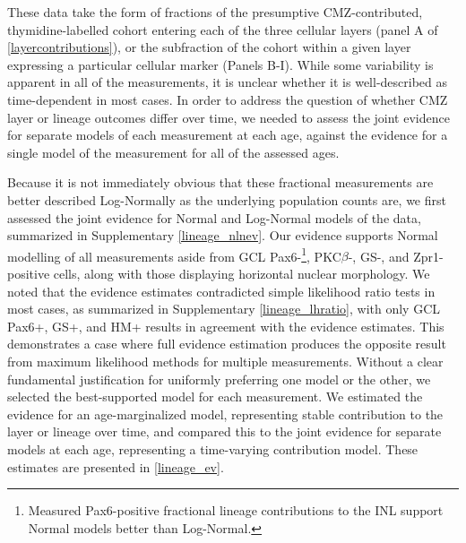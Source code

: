 These data take the form of fractions of the presumptive CMZ-contributed, thymidine-labelled cohort entering each of the three cellular layers (panel A of \autoref{layercontributions}), or the subfraction of the cohort within a given layer expressing a particular cellular marker (Panels B-I). While some variability is apparent in all of the measurements, it is unclear whether it is well-described as time-dependent in most cases. In order to address the question of whether CMZ layer or lineage outcomes differ over time, we needed to assess the joint evidence for separate models of each measurement at each age, against the evidence for a single model of the measurement for all of the assessed ages. 

Because it is not immediately obvious that these fractional measurements are better described Log-Normally as the underlying population counts are, we first assessed the joint evidence for Normal and Log-Normal models of the data, summarized in Supplementary \autoref{lineage_nlnev}. Our evidence supports Normal modelling of all measurements aside from GCL Pax6-\footnote{Measured Pax6-positive fractional lineage contributions to the INL support Normal models better than Log-Normal.}, PKC$\beta$-, GS-, and Zpr1-positive cells, along with those displaying horizontal nuclear morphology. We noted that the evidence estimates contradicted simple likelihood ratio tests in most cases, as summarized in Supplementary \autoref{lineage_lhratio}, with only GCL Pax6+, GS+, and HM+ results in agreement with the evidence estimates. This demonstrates a case where full evidence estimation produces the opposite result from maximum likelihood methods for multiple measurements.  Without a clear fundamental justification for uniformly preferring one model or the other, we selected the best-supported model for each measurement. We estimated the evidence for an age-marginalized model, representing stable contribution to the layer or lineage over time, and compared this to the joint evidence for separate models at each age, representing a time-varying contribution model. These estimates are presented in \autoref{lineage_ev}.

